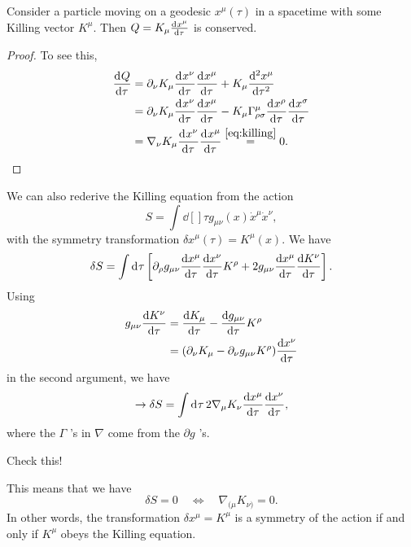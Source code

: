 \begin{claim}
  Consider a particle moving on a geodesic $x^{\mu}(\tau)$ in a spacetime with some Killing vector $K^{\mu}$.
  Then $Q = K_{\mu} \dv[]{x^{\mu}}{\tau}$ is conserved.
\end{claim}
\begin{proof}
  To see this,
  \begin{align}
    \dv[]{Q}{\tau} &= \partial_{\nu} K_{\mu} \dv[]{x^{\nu}}{\tau} \dv[]{x^{\mu}}{\tau} + K_{\mu} \dv[2]{x^{\mu}}{\tau} \\
    &= \partial_{\nu} K_{\mu} \dv[]{x^{\nu}}{\tau} \dv[]{x^{\mu}}{\tau} -  K_{\mu} \Gamma^{\mu}_{\rho\sigma} \dv[]{x^{\rho}}{\tau} \dv[]{x^{\sigma}}{\tau} \\
    &= \nabla_{\nu} K_{\mu} \dv[]{x^{\nu}}{\tau} \dv[]{x^{\mu}}{\tau} \stackrel{\eqref{eq:killing}}{=} 0.
  \end{align}
\end{proof}

We can also rederive the Killing equation from the action
\begin{equation}
  S = \int \dd[]{\tau} g_{\mu\nu} (x) \dot{x}^{\mu} \dot{x}^{\nu},
\end{equation}
with the symmetry transformation $\delta x^{\mu} (\tau) = K^{\mu}(x)$. We have
\begin{equation}
  \delta S = \int \dd[]{\tau} \left[ \partial_{\rho} g_{\mu\nu} \dv{x^{\mu}}{\tau} \dv{x^{\nu}}{\tau} K^{\rho} + 2g_{\mu\nu} \dv{x^{\mu}}{\tau} \dv{K^{\nu}}{\tau} \right].
\end{equation}
Using 
\begin{align}
  g_{\mu\nu} \dv{K^{\nu}}{\tau} &=\dv{K_{\mu}}{\tau} - \dv{g_{\mu\nu}}{\tau} K^{\rho} \\
				&= (\partial_{\nu} K_{\mu} - \partial_{\nu} g_{\mu\nu} K^{\rho}) \dv{x^{\nu}}{\tau}
\end{align}
in the second argument, we have
\begin{equation}
  \rightarrow \delta S = \int \dd[]{\tau} 2 \nabla_{\mu} K_{\nu} \dv{x^{\mu}}{\tau} \dv{x^{\nu}}{\tau},
\end{equation}
where the $\Gamma$ 's in $\nabla$ come from the $\partial g$ 's.
\begin{exercise}
  Check this!
\end{exercise}
This means that we have
\begin{equation}
  \delta S = 0 \quad \iff \quad \nabla_{(\mu} K_{\nu)} = 0.
\end{equation}
In other words, the transformation $\delta x^{\mu} = K^{\mu}$ is a symmetry of the action if and only if $K^{\mu}$ obeys the Killing equation.
